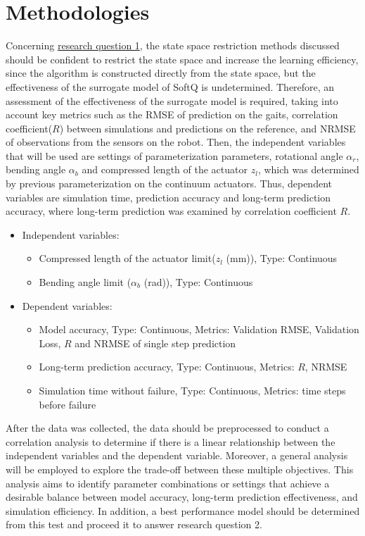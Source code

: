 \section{Methodologies}
\label{Sec:test_def}
Concerning \hyperref[rq1]{research question 1}, the state space restriction methods discussed should be confident to restrict the state space and increase the learning efficiency, since the algorithm is constructed directly from the state space, but the effectiveness of the surrogate model of SoftQ is undetermined. Therefore, an assessment of the effectiveness of the surrogate model is required, taking into account key metrics such as the \ac{RMSE} of prediction on the gaits, correlation coefficient($R$) between simulations and predictions on the reference, and \ac{NRMSE} of observations from the sensors on the robot. Then, the independent variables that will be used are settings of parameterization parameters, rotational angle $\alpha_r$, bending angle $\alpha_b$ and compressed length of the actuator $z_l$, which was determined by previous parameterization on the continuum actuators\cite{ji2022Omnidirectional}. Thus, dependent variables are simulation time, prediction accuracy and long-term prediction accuracy, where long-term prediction was examined by correlation coefficient $R$.
\begin{itemize}
    \item Independent variables: 
    \begin{itemize}
        \item Compressed length of the actuator limit($z_l$ (mm)), Type: Continuous
        \item Bending angle limit ($\alpha_b$ (rad)), Type: Continuous
    \end{itemize}
    \item Dependent variables:
    \begin{itemize} 
        \item Model accuracy, Type: Continuous, Metrics: Validation RMSE, Validation Loss, $R$ and NRMSE of single step prediction
        \item Long-term prediction accuracy, Type: Continuous, Metrics: $R$, NRMSE
        \item Simulation time without failure, Type: Continuous, Metrics: time steps before failure 
    \end{itemize}
\end{itemize}
After the data was collected, the data should be preprocessed to conduct a correlation analysis to determine if there is a linear relationship between the independent variables and the dependent variable. Moreover, a general analysis will be employed to explore the trade-off between these multiple objectives. This analysis aims to identify parameter combinations or settings that achieve a desirable balance between model accuracy, long-term prediction effectiveness, and simulation efficiency. In addition, a best performance model should be determined from this test and proceed it to answer research question 2. 

